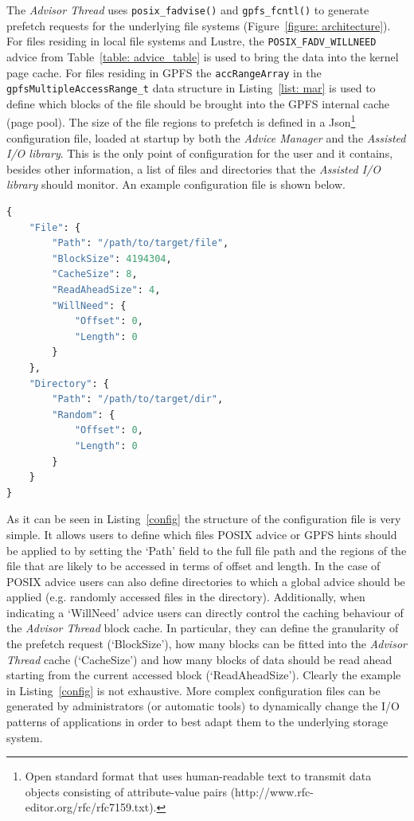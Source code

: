 The \textit{Advisor Thread} uses \texttt{posix\_fadvise()} and \texttt{gpfs\_fcntl()} to generate prefetch requests for the underlying file systems (Figure~\ref{figure: architecture}). For files residing in local file systems and Lustre, the \texttt{POSIX\_FADV\_WILLNEED} advice from Table~\ref{table: advice_table} is used to bring the data into the kernel page cache. For files residing in GPFS the \texttt{accRangeArray} in the \texttt{gpfsMultipleAccessRange\_t} data structure in Listing~\ref{list: mar} is used to define which blocks of the file should be brought into the GPFS internal cache (page pool). 
The size of the file regions to prefetch is defined in a Json\footnote{Open standard format that uses human-readable text to transmit data objects consisting of attribute-value pairs (http://www.rfc-editor.org/rfc/rfc7159.txt).} configuration file, loaded at startup by both the \textit{Advice Manager} and the \textit{Assisted I/O library}. This is the only point of configuration for the user and it contains, besides other information, a list of files and directories that the \textit{Assisted I/O library} should monitor. An example configuration file is shown below. 

\begin{lstlisting}[language=python, caption=Example of Json Configuration File, label={config}]
{
    "File": {
        "Path": "/path/to/target/file",
        "BlockSize": 4194304,
        "CacheSize": 8,
        "ReadAheadSize": 4,
        "WillNeed": {
            "Offset": 0,
            "Length": 0
        }
    },
    "Directory": {
        "Path": "/path/to/target/dir",
        "Random": {
            "Offset": 0,
            "Length": 0
        }
    }
}
\end{lstlisting}
As it can be seen in Listing~\ref{config} the structure of the configuration file is very simple. It allows users to define which files POSIX advice or GPFS hints should be applied to by setting the `Path' field to the full file path and the regions of the file that are likely to be accessed in terms of offset and length. In the case of POSIX advice users can also define directories to which a global advice should be applied (e.g. randomly accessed files in the directory). Additionally, when indicating a `WillNeed' advice users can directly control the caching behaviour of the \textit{Advisor Thread} block cache. In particular, they can define the granularity of the prefetch request (`BlockSize'), how many blocks can be fitted into the \textit{Advisor Thread} cache (`CacheSize') and how many blocks of data should be read ahead starting from the current accessed block (`ReadAheadSize'). Clearly the example in Listing~\ref{config} is not exhaustive. More complex configuration files can be generated by administrators (or automatic tools) to dynamically change the I/O patterns of applications in order to best adapt them to the underlying storage system.

